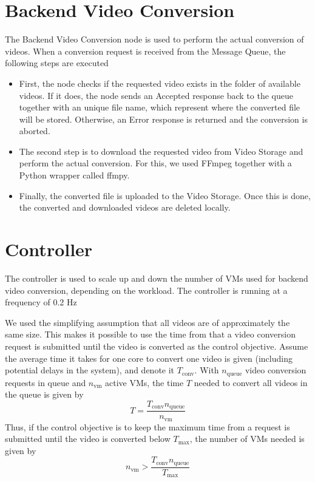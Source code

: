 \documentclass[a4paper, 10pt, english]{article}
\begin{document}
\section{Backend Video Conversion} \label{sec:BE}
The Backend Video Conversion node is used to perform the actual conversion of videos. When a conversion request is received from the Message Queue, the following steps are executed
\begin{itemize}
	\item First, the node checks if the requested video exists in the folder of available videos. If it does, the node sends an Accepted response back to the queue together with an unique file name, which represent where the converted file will be stored. Otherwise, an Error response is returned and the conversion is aborted. 
	\item The second step is to download the requested video from Video Storage and perform the actual conversion. For this, we used FFmpeg together with a Python wrapper called ffmpy.
	\item Finally, the converted file is uploaded to the Video Storage. Once this is done, the converted and downloaded videos are deleted locally.
\end{itemize}

\section{Controller} \label{sec:Controller}
The controller is used to scale up and down the number of VMs used for backend video conversion, depending on the workload. The controller is running at a frequency of 0.2 Hz

We used the simplifying assumption that all videos are of approximately the same size. This makes it possible to use the time from that a video conversion request is submitted until the video is converted as the control objective. Assume the average time it takes for one core to convert one video is given (including potential delays in the system), and denote it $ T_{\text{conv}} $. With $ n_{\text{queue}} $ video conversion requests in queue and $ n_{\text{vm}} $ active VMs, the time $ T $ needed to convert all videos in the queue is given by
\begin{equation}
T = \frac{T_{\text{conv}}  n_{\text{queue}}}{n_{\text{vm}}}
\end{equation}
Thus, if the control objective is to keep the maximum time from a request is submitted until the video is converted below $ T_{\text{max}} $, the number of VMs needed is given by
\begin{equation}
n_{\text{vm}} > \frac{T_{\text{conv}}  n_{\text{queue}}}{T_{\text{max}}}
\end{equation}
\end{document}
